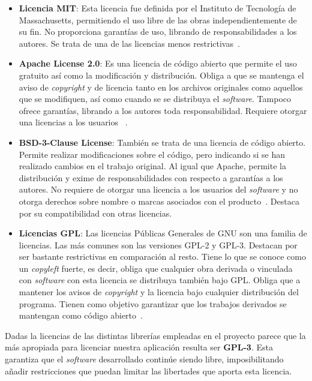 \begin{itemize}
	\item \textbf{Licencia MIT}: Esta licencia fue definida por el Instituto de Tecnología de Massachusetts, permitiendo el uso libre de las obras independientemente de su fin. No proporciona garantías de uso, librando de responsabilidades a los autores. Se trata de una de las licencias menos restrictivas~\cite{MIT}.
	
	\item \textbf{Apache License 2.0}: Es una licencia de código abierto que permite el uso gratuito así como la modificación y distribución. Obliga a que se mantenga el aviso de \textit{copyright} y de licencia tanto en los archivos originales como aquellos que se modifiquen, así como cuando se se distribuya el \textit{software}. Tampoco ofrece garantías, librando a los autores toda responsabilidad. Requiere otorgar una licencias a los usuarios ~\cite{apache}.
	
	\item \textbf{BSD-3-Clause License}: También se trata de una licencia de código abierto. Permite realizar modificaciones sobre el código, pero indicando si se han realizado cambios en el trabajo original. Al igual que Apache, permite la distribución y exime de responsabilidades con respecto a garantías a los autores. No requiere de otorgar una licencia a los usuarios del \textit{software} y no otorga derechos sobre nombre o marcas asociados con el producto~\cite{BSD}. Destaca por su compatibilidad con otras licencias.
	
	\item \textbf{Licencias GPL}: Las licencias Públicas Generales de GNU son una familia de licencias. Las más comunes son las versiones GPL-2 y GPL-3. Destacan por ser bastante restrictivas en comparación al resto. Tiene lo que se conoce como un \textit{copyleft} fuerte, es decir, obliga que cualquier obra derivada o vinculada con \textit{software} con esta licencia se distribuya también bajo GPL. Obliga que a mantener los avisos de \textit{copyright} y la licencia bajo cualquier distribución del programa. Tienen como objetivo garantizar que los trabajos derivados se mantengan como código abierto~\cite{GPL}.
	
\end{itemize}

Dadas la licencias de las distintas librerías empleadas en el proyecto parece que la más apropiada para licenciar nuestra aplicación resulta ser \textbf{GPL-3}. Esta garantiza que el \textit{software} desarrollado continúe siendo libre, imposibilitando añadir restricciones que puedan limitar las libertades que aporta esta licencia.

